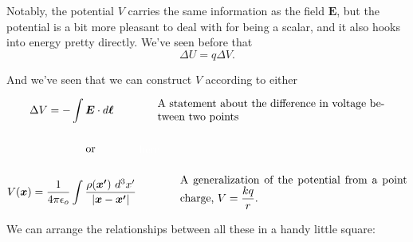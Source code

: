 \documentclass{article}
\begin{document}
Notably, the potential $V$ carries the same information as the field $\bm{E}$, but the potential is a bit more pleasant to deal with for being a scalar, and it also hooks into energy pretty directly. We've seen before that
\begin{equation*}
    \Delta U = q \Delta V.
\end{equation*}

And we've seen that we can construct $V$ according to either

\begin{gather*}
    \Delta V = -\int \bm{E} \cdot d\bm{\ell} \qquad\qquad \parbox[c]{0.6\textwidth}{A statement about the difference in voltage between two points} \\[1.4em]
    \text{or} \qquad\qquad \parbox[c]{0.5\textwidth}{\textcolor{white}{here}} \\[1.4em]
    V(\bm{x}) = \frac{1}{4\pi\epsilon_o} \int \frac{\rho(\bm{x'})\ d^3x'}{\left| \bm{x} - \bm{x'} \right|} \qquad\qquad \parbox[c]{0.6\textwidth}{A generalization of the potential from a point charge, $\displaystyle V = \frac{kq}{r}.$}
\end{gather*}

\newpage

We can arrange the relationships between all these in a handy little square:
\end{document}
